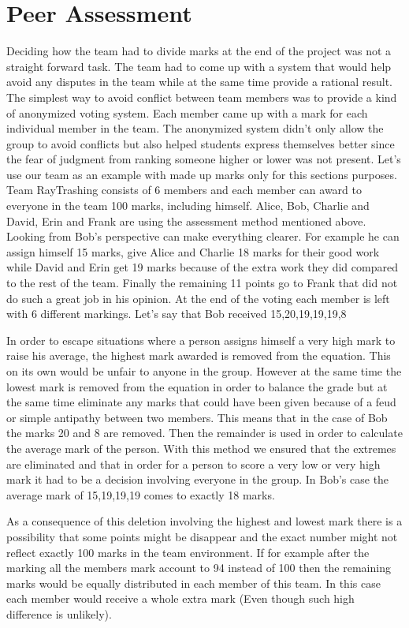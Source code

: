 \documentclass[10pt]{scrartcl}
\begin{document}
\section{Peer Assessment}
Deciding how the team had to divide marks at the end of the project was not a straight forward task. The team had to come up with a system that would help avoid any disputes in the team while at the same time provide a rational result. The simplest way to avoid conflict between team members was to provide a kind of anonymized voting system. Each member came up with a mark for each individual member in the team. The anonymized system didn’t only allow the group to avoid conflicts but also helped students express themselves better since the fear of judgment from ranking someone higher or lower was not present. 
Let’s use our team as an example with made up marks only for this sections purposes. Team RayTrashing consists of 6 members and each member can award to everyone in the team 100 marks, including himself. Alice, Bob, Charlie and David, Erin and Frank are using the assessment method mentioned above.  Looking from Bob’s perspective can make everything clearer. For example he can assign himself 15 marks, give Alice and Charlie 18 marks for their good work while David and Erin get 19 marks because of the extra work they did compared to the rest of the team. Finally the remaining 11 points go to Frank that did not do such a great job in his opinion. At the end of the voting each member is left with 6 different markings. Let’s say that Bob received 15,20,19,19,19,8 \par
In order to escape situations where a person assigns himself a very high mark to raise his average, the highest mark awarded is removed from the equation. This on its own would be unfair to anyone in the group. However at the same time the lowest mark is removed from the equation in order to balance the grade but at the same time eliminate any marks that could have been given because of a feud or simple antipathy between two members. This means that in the case of Bob the marks 20 and 8 are removed. Then the remainder is used in order to calculate the average mark of the person. With this method we ensured that the extremes are eliminated and that in order for a person to score a very low or very high mark it had to be a decision involving everyone in the group. In Bob’s case the average mark of 15,19,19,19 comes to exactly 18 marks.\par
 As a consequence of this deletion involving the highest and lowest mark there is a possibility that some points might be disappear and the exact number might not reflect exactly 100 marks in the team environment. If for example after the marking all the members mark account to 94 instead of 100 then the remaining marks would be equally distributed in each member of this team. In this case each member would receive a whole extra mark (Even though such high difference is unlikely). \par
\end{document}
